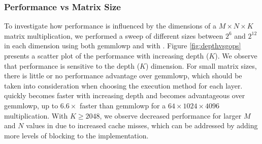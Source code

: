 \documentclass[sigconf]{acmart}
\begin{document}
\subsubsection{Performance vs Matrix Size}
\label{sec:perfvssize}
To investigate how performance is influenced by the dimensions of a $M \times N \times K$ matrix multiplication, we performed a sweep of different sizes between $2^6$ and $2^{12}$ in each dimension using both gemmlowp and \ours{} with .
Figure \ref{fig:depthvsgops} presents a scatter plot of the performance with increasing depth ($K$).
We observe that \ours{} performance is sensitive to the depth ($K$) dimension.
For small matrix sizes, there is little or no performance advantage over gemmlowp, which should be taken into consideration when choosing the execution method for each layer.
\ours{} quickly becomes faster with increasing depth and becomes advantageous over gemmlowp, up to $6.6\times$ faster than gemmlowp for a $64 \times 1024 \times 4096$ multiplication.
With $K \geq 2048$, we observe decreased performance for larger $M$ and $N$ values in \ours{} due to increased cache misses, which can be addressed by adding more levels of blocking to the implementation.
\end{document}
